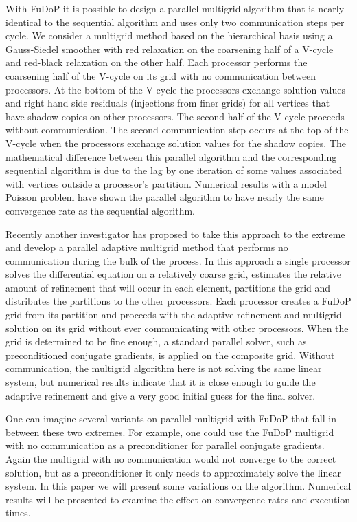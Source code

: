 \documentclass[11pt]{article}
\begin{document}
With FuDoP it is possible to design a parallel multigrid algorithm that is
nearly identical to the sequential algorithm and uses only two communication
steps per cycle.  We consider a multigrid method based on the hierarchical
basis using a Gauss-Siedel smoother with red relaxation on the coarsening
half of a V-cycle and red-black relaxation on the other half.  Each processor
performs the coarsening half of the V-cycle on its grid with no communication
between processors.  At the bottom of the V-cycle the processors exchange
solution values and right hand side residuals (injections from finer grids)
for all vertices that have shadow copies on other processors.  The second
half of the V-cycle proceeds without communication.  The second communication
step occurs at the top of the V-cycle when the processors exchange solution
values for the shadow copies.  The mathematical difference between this
parallel algorithm and the corresponding sequential algorithm is due to the
lag by one iteration of some values associated with vertices outside a
processor's partition.  Numerical results with a model Poisson problem have
shown the parallel algorithm to have nearly the same convergence rate as
the sequential algorithm.

Recently another investigator has proposed to take this approach to the extreme
and develop a parallel adaptive multigrid method that performs no communication
during the bulk of the process.  In this approach a single processor solves
the differential equation on a relatively coarse grid, estimates the relative
amount of refinement that will occur in each element, partitions the grid
and distributes the partitions to the other processors.  Each processor
creates a FuDoP grid from its partition and proceeds with the adaptive
refinement and multigrid solution on its grid without ever communicating
with other processors.  When the grid is determined to be fine enough, a
standard parallel solver, such as preconditioned conjugate gradients, is
applied on the composite grid.  Without communication, the multigrid
algorithm here is not solving the same linear system, but numerical results
indicate that it is close enough to guide the adaptive refinement and give
a very good initial guess for the final solver.

One can imagine several variants on parallel multigrid with FuDoP that fall
in between these two extremes.  For example, one could use the FuDoP multigrid
with no communication as a preconditioner for parallel conjugate gradients.
Again the multigrid with no communication would not converge to the correct
solution, but as a preconditioner it only needs to approximately solve the
linear system.  In this paper we will present some variations on the algorithm.
Numerical results will be presented to examine the effect on convergence
rates and execution times.
\end{document}
